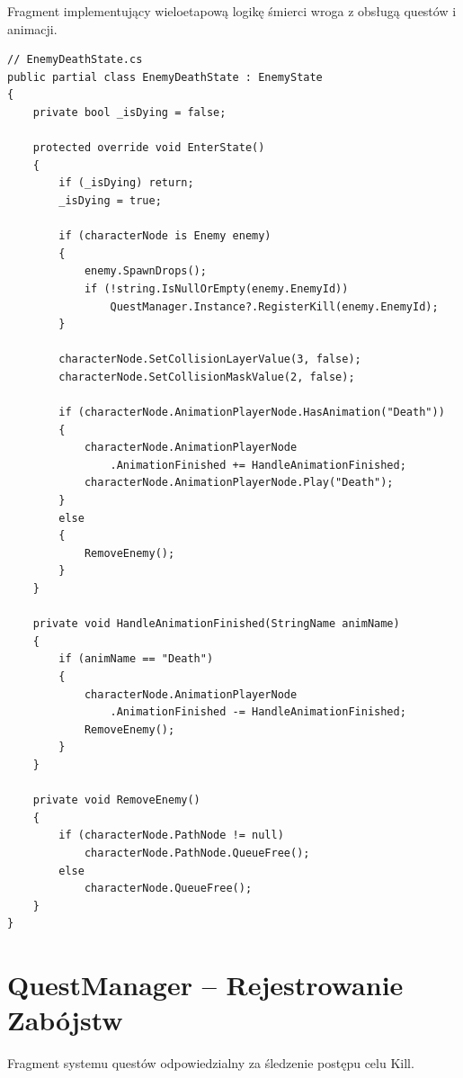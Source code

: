 Fragment implementujący wieloetapową logikę śmierci wroga z obsługą questów i animacji.

\begin{verbatim}
// EnemyDeathState.cs
public partial class EnemyDeathState : EnemyState
{
    private bool _isDying = false;

    protected override void EnterState()
    {
        if (_isDying) return;
        _isDying = true;

        if (characterNode is Enemy enemy)
        {
            enemy.SpawnDrops();
            if (!string.IsNullOrEmpty(enemy.EnemyId))
                QuestManager.Instance?.RegisterKill(enemy.EnemyId);
        }

        characterNode.SetCollisionLayerValue(3, false);
        characterNode.SetCollisionMaskValue(2, false);

        if (characterNode.AnimationPlayerNode.HasAnimation("Death"))
        {
            characterNode.AnimationPlayerNode
                .AnimationFinished += HandleAnimationFinished;
            characterNode.AnimationPlayerNode.Play("Death");
        }
        else
        {
            RemoveEnemy();
        }
    }

    private void HandleAnimationFinished(StringName animName)
    {
        if (animName == "Death")
        {
            characterNode.AnimationPlayerNode
                .AnimationFinished -= HandleAnimationFinished;
            RemoveEnemy();
        }
    }

    private void RemoveEnemy()
    {
        if (characterNode.PathNode != null)
            characterNode.PathNode.QueueFree();
        else
            characterNode.QueueFree();
    }
}
\end{verbatim}

\section{QuestManager – Rejestrowanie Zabójstw}

Fragment systemu questów odpowiedzialny za śledzenie postępu celu Kill.

